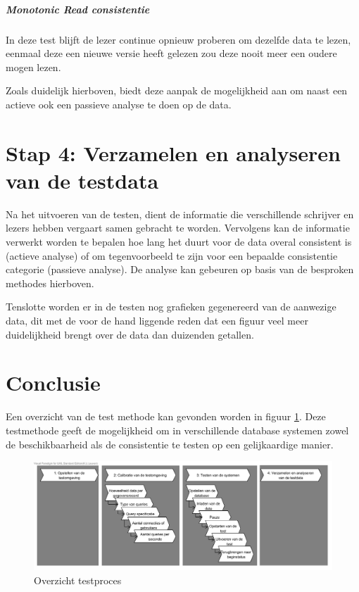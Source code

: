 \subparagraph{Monotonic Read consistentie} In deze test blijft de lezer continue opnieuw proberen om dezelfde data te lezen, eenmaal deze een nieuwe versie heeft gelezen zou deze nooit meer een oudere mogen lezen. 

Zoals duidelijk hierboven, biedt deze aanpak de mogelijkheid aan om naast een actieve ook een passieve analyse te doen op de data. 

\section{Stap 4: Verzamelen en analyseren van de testdata}
Na het uitvoeren van de testen, dient de informatie die verschillende schrijver en lezers hebben vergaart samen gebracht te worden. Vervolgens kan de informatie verwerkt worden te bepalen hoe lang het duurt voor de data overal consistent is (actieve analyse) of om  tegenvoorbeeld te zijn voor een bepaalde consistentie categorie (passieve analyse). De analyse kan gebeuren op basis van de besproken methodes hierboven. 

Tenslotte worden er in de testen nog grafieken gegenereerd van de aanwezige data, dit met de voor de hand liggende reden dat een figuur veel meer duidelijkheid brengt over de data dan duizenden getallen.  

\section{Conclusie}
Een overzicht van de test methode kan gevonden worden in figuur \ref{fig:test-process-detailed}. Deze testmethode geeft de mogelijkheid om in verschillende database systemen zowel de beschikbaarheid als de consistentie te testen op een gelijkaardige manier. 

\begin{figure}[h!]
\centering
\includegraphics[width=\linewidth]{img/Test-Process-Detailed-Overview}
\caption{Overzicht testproces}
\label{fig:test-process-detailed}
\end{figure}
